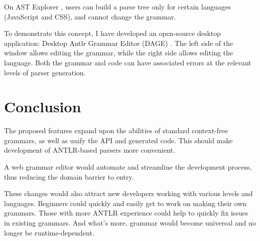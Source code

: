 \documentclass[sigplan,screen]{acmart}
\begin{document}
On AST Explorer \cite{astexplorer}, users can build a parse tree only for
certain languages (JavaScript and CSS), and cannot change the grammar.

To demonstrate this concept, I have developed an open-source desktop
application: Desktop Antlr Grammar Editor (DAGE) \cite{dage}. The left side of
the window allows editing the grammar, while the right side allows editing the
language. Both the grammar and code can have associated errors at the relevant
levels of parser generation.

\section{Conclusion}

The proposed features expand upon the abilities of standard context-free
grammars, as well as unify the API and generated code. This should make
development of ANTLR-based parsers more convenient.

A web grammar editor would automate and streamline the development
process, thus reducing the domain barrier to entry.

These changes would also attract new developers working with various
levels and languages. Beginners could quickly and easily get to work on
making their own grammars. Those with more ANTLR experience could help
to quickly fix issues in existing grammars. And what's more, grammar
would become universal and no longer be runtime-dependent.


\end{document}

